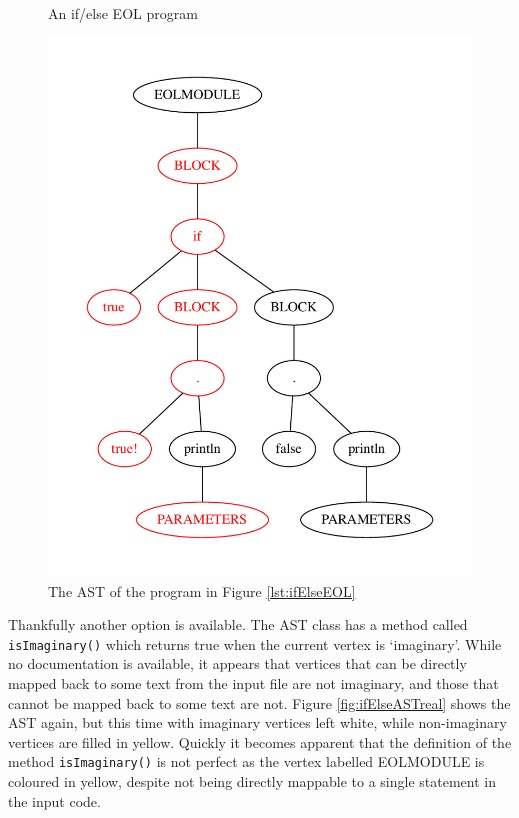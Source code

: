 \begin{figure}
\centering
\begin{minipage}{.5\textwidth}
  \centering
  
  \caption{An if/else EOL program}
  \label{lst:ifElseEOL}
\end{minipage}%
\begin{minipage}{.5\textwidth}
  \centering
  \includegraphics[scale=0.5]{figures/ifElseAST.pdf}
  \caption{The AST of the program in Figure \ref{lst:ifElseEOL}}
  \label{fig:ifElseAST}
\end{minipage}
\end{figure}

Thankfully another option is available. The AST class has a method called \verb|isImaginary()| which returns true when the current vertex is `imaginary'. While no documentation is available, it appears that vertices that can be directly mapped back to some text from the input file are not imaginary, and those that cannot be mapped back to some text are not. Figure \ref{fig:ifElseASTreal} shows the AST again, but this time with imaginary vertices left white, while non-imaginary vertices are filled in yellow. Quickly it becomes apparent that the definition of the method \verb+isImaginary()+ is not perfect as the vertex labelled EOLMODULE is coloured in yellow, despite not being directly mappable to a single statement in the input code. 

